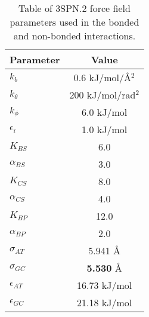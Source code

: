 \documentclass[aip,jcp, preprint, amssymb, amsmath]{revtex4-1}
\begin{document}
\begin{table}
\begin{ruledtabular}
 \caption{Table of 3SPN.2 force field parameters used in the bonded and non-bonded interactions.\label{Parameters}}

\begin{tabular}{|l|c|}
\textbf{Parameter} & \textbf{Value}  \\ \hline
$k_b$ & 0.6 kJ/mol/\AA$^2$ \\
$k_\theta$ & 200 kJ/mol/rad$^2$ \\
$k_\phi$ & 6.0 kJ/mol \\
$\epsilon_\text{r}$ & 1.0 kJ/mol \\
$K_{BS}$ & 6.0\\
$\alpha_{BS}$ & 3.0 \\
$K_{CS}$ & 8.0 \\
$\alpha_{CS}$ & 4.0 \\
$K_{BP}$ & 12.0 \\
$\alpha_{BP}$ & 2.0\\
$\sigma_{AT}$ & 5.941 \AA\\
$\sigma_{GC}$ & \textbf{5.530} \AA\\
$\epsilon_{AT}$ & 16.73 kJ/mol\\
$\epsilon_{GC}$ & 21.18 kJ/mol\\
\end{tabular}
\end{ruledtabular}
\end{table}
\end{document}
